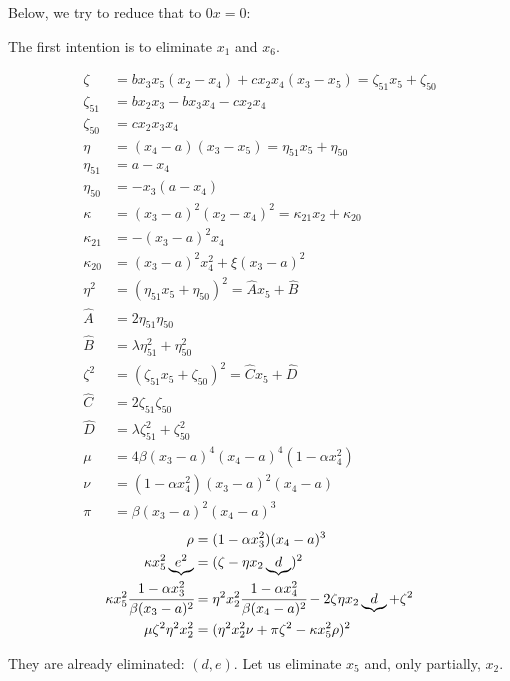 Below, we try to reduce that to $0x = 0$:

The first intention is to eliminate $x_1$ and $x_6$.

\begin{align}
\zeta &= b x_3 x_5 (x_2 - x_4) + cx_2 x_4(x_3 - x_5) = \zeta_{51} x_5 + \zeta_{50} \\
\zeta_{51} &= bx_2x_3 - b x_3x_4 - cx_2 x_4 \\
\zeta_{50} &= cx_2 x_3 x_4 \\
\eta &= (x_4-a) (x_3 - x_5) = \eta_{51} x_5 + \eta_{50} \\
\eta_{51} &= a - x_4 \\
\eta_{50} &= -x_3 (a - x_4)\\
\kappa &= (x_3-a)^2 (x_2 - x_4)^2 =\kappa_{21} x_2 + \kappa_{20} \\
\kappa_{21} &= - (x_3-a)^2 x_4\\
\kappa_{20} &= (x_3-a)^2 x_4^2 + \xi (x_3-a)^2\\
\eta^2 &= (\eta_{51} x_5 + \eta_{50})^2 = \hat A x_5 + \hat B \\
\hat A &= 2\eta_{51}\eta_{50} \\
\hat B &= \lambda \eta_{51}^2 + \eta_{50}^2\\
\zeta^2 &= (\zeta_{51} x_5 + \zeta_{50})^2  = \hat C x_5 + \hat D\\
\hat C &= 2\zeta_{51}\zeta_{50} \\
\hat D &= \lambda \zeta_{51}^2 + \zeta_{50}^2 \\
\mu &= 4\beta (x_3 - a)^4 (x_4 - a)^4(1 - \alpha x_4^2 ) \\
\nu &= (1 - \alpha x_4^2)(x_3-a)^2(x_4-a)\\
\pi &= \beta (x_3-a)^2(x_4-a)^3
\end{align}
\begin{align}
\rho &= (1 - \alpha x_3^2 )(x_4-a)^3\\
\kappa x_5^2 \underbrace{e^2} &= (\zeta - \eta x_2 \underbrace{d})^2 \\ 
\kappa x_5^2 \cfrac{1 - \alpha x_3^2 }{\beta (x_3-a)^2} &= \eta^2 x_2^2 \cfrac{1 - \alpha x_4^2 }{\beta (x_4-a)^2} - 2 \zeta \eta x_2 \underbrace{d} + \zeta^2 \\
 \mu \zeta^2 \eta^2 x_2^2  &= (\eta^2 x_2^2 \nu  + \pi \zeta^2 - \kappa x_5^2 \rho)^2 
\end{align}

They are already eliminated: $(d,e)$. Let us eliminate $x_5$ and, only partially, $x_2$.

